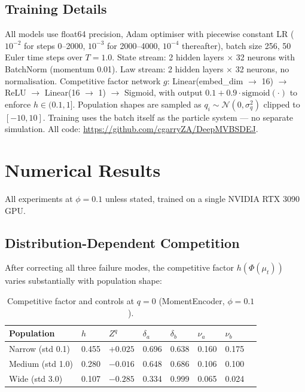 \documentclass[11pt,a4paper]{article}
\newcommand{\mup}{\mu_t}
\begin{document}
\subsection{Training Details}

All models use float64 precision, Adam optimiser with piecewise constant LR ($10^{-2}$ for steps 0--2000, $10^{-3}$ for 2000--4000, $10^{-4}$ thereafter), batch size 256, 50 Euler time steps over $T = 1.0$. State stream: 2 hidden layers $\times$ 32 neurons with BatchNorm (momentum 0.01). Law stream: 2 hidden layers $\times$ 32 neurons, no normalisation. Competitive factor network $g$: Linear(embed\_dim $\to$ 16) $\to$ ReLU $\to$ Linear(16 $\to$ 1) $\to$ Sigmoid, with output $0.1 + 0.9 \cdot \text{sigmoid}(\cdot)$ to enforce $h \in (0.1, 1]$. Population shapes are sampled as $q_i \sim \mathcal{N}(0, \sigma_q^2)$ clipped to $[-10, 10]$. Training uses the batch itself as the particle system --- no separate simulation. All code: \url{https://github.com/cgarryZA/DeepMVBSDEJ}.

\section{Numerical Results}
\label{sec:results}

All experiments at $\phi = 0.1$ unless stated, trained on a single NVIDIA RTX 3090 GPU.

\subsection{Distribution-Dependent Competition}

After correcting all three failure modes, the competitive factor $h(\Phi(\mup))$ varies substantially with population shape:

\begin{table}[!htb]
\centering
\caption{Competitive factor and controls at $q = 0$ (MomentEncoder, $\phi = 0.1$).}
\label{tab:control_sensitivity}
\begin{tabular}{@{}llllllll@{}}
\toprule
Population & $h$ & $Z^q$ & $\delta_a$ & $\delta_b$ & $\nu_a$ & $\nu_b$ \\
\midrule
Narrow (std 0.1) & 0.455 & $+0.025$ & 0.696 & 0.638 & 0.160 & 0.175 \\
Medium (std 1.0) & 0.280 & $-0.016$ & 0.648 & 0.686 & 0.106 & 0.100 \\
Wide (std 3.0)   & 0.107 & $-0.285$ & 0.334 & 0.999 & 0.065 & 0.024 \\
\bottomrule
\end{tabular}
\end{table}
\end{document}
